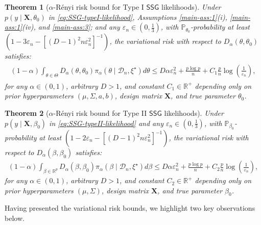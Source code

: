 \documentclass[12pt]{article}
\newtheorem{theorem}{Theorem}
\numberwithin{equation}{section}
\newcommand{\ssg}{\mathsf{SSG}}
\begin{document}
\begin{theorem}[$\alpha$-R\'{e}nyi risk bound for Type I $\ssg$ likelihoods]
\label{theorem-alpha-less-1-variational-risk-bound-Type-I}
Under $p(y\mid \mathbf{X}, \theta_0)$ in \eqref{eq:SSG-typeI-likelihood}, Assumptions \ref{main-ass:1}(i), \ref{main-ass:1}(iv), and \ref{main-ass:3}; and any $\varepsilon_n \in \left(0, \frac{1}{3}\right)$, with $\mathbb{P}_{\theta_0}$-probability at least $\left(1-3\varepsilon_n - [(D-1)^2 n \varepsilon_n^2]^{-1}\right)$, the variational risk with respect to $D_{\alpha}(\theta, \theta_0)$ satisfies:
%
\begin{align}\label{eq:type-1-risk-bound-alpha-less-1}
    \begin{split}
    (1-\alpha)\int_{\theta\in \Theta}D_{\alpha}(\theta, \theta_0)\pi_{\alpha}(\theta\mid \mathcal{D}_n, \xi^{\star})d\theta
        \leq D\alpha \varepsilon_n^2 + \frac{p\log p}{n} + C_1\frac{p}{n}\log\left(\frac{1}{\varepsilon_n}\right),
    \end{split}
\end{align}
%
for any $\alpha\in (0,1)$, arbitrary $D>1$, and constant $C_1 \in \mathbb{R}^{+}$ depending only on prior hyperparameters $(\mu, \Sigma, a, b)$, design matrix $\mathbf{X}$, and true parameter $\theta_0$.
\end{theorem}

\begin{theorem}[$\alpha$-R\'{e}nyi risk bound for Type II $\ssg$ likelihoods]
\label{theorem-alpha-less-1-variational-risk-bound-Type-II}
Under $p(y\mid \mathbf{X}, \beta_0)$ in \eqref{eq:SSG-typeII-likelihood} and any $\varepsilon_n\in \left(0, \frac{1}{3}\right)$, with $\mathbb{P}_{\beta_0}$-probability at least $\left(1-2\varepsilon_n - [(D-1)^2n\varepsilon_n^2]^{-1}\right)$, the variational risk with respect to $D_{\alpha}(\beta, \beta_0)$ satisfies:
%
\begin{equation}\label{eq:type-2-risk-bound-alpha-less-1}
\begin{split}
(1-\alpha)\int_{\beta\in \mathbb{R}^p} D_{\alpha}(\beta, \beta_0)\pi_\alpha(\beta \mid \mathcal{D}_n, \xi^{\star})d\beta \leq D\alpha \varepsilon_n^2 + \frac{p\log p}{n} + C_2\frac{p}{n}\log\left(\frac{1}{\varepsilon_n}\right),
\end{split}
\end{equation}
%
for any $\alpha\in (0, 1)$, arbitrary $D>1$, and constant $C_2\in \mathbb{R}^{+}$ depending only on prior hyperparameters $(\mu, \Sigma)$, design matrix $\mathbf{X}$, and true parameter $\beta_0$.
\end{theorem}
Having presented the variational risk bounds, we highlight two key observations below.
%
\end{document}
